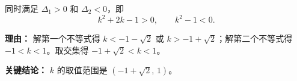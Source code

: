 \begin{examplebox}
\begin{description}[style=nextline, leftmargin=2.8em, labelsep=0.5em, itemsep=0.45em]
		\item[\textbf{第四步（解不等式组）：}]
		      同时满足 $\Delta_{1}>0$ 和 $\Delta_{2}<0$，即
		      \[
			      k^{2}+2k-1>0,\qquad k^{2}-1<0.
		      \]
		      \par\textbf{理由：} 解第一个不等式得 $k<-1-\sqrt{2}$ 或 $k>-1+\sqrt{2}$；解第二个不等式得 $-1<k<1$。取交集得 $-1+\sqrt{2}<k<1$。
	\end{description}

	\textbf{\textcolor{CExample}{关键结论：}} $k$ 的取值范围是 $(-1+\sqrt{2},\,1)$。
\end{examplebox}